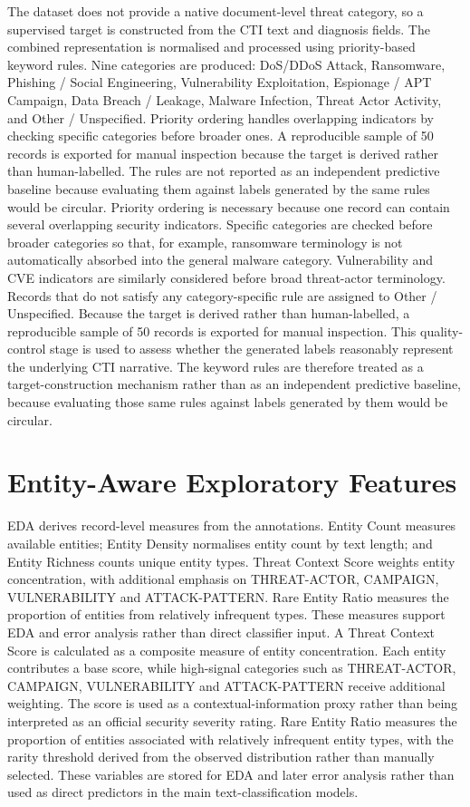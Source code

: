 \documentclass[12pt,a4paper]{report}
\begin{document}
The dataset does not provide a native document-level threat category, so
a supervised target is constructed from the CTI text and diagnosis
fields. The combined representation is normalised and processed using
priority-based keyword rules. Nine categories are produced: DoS/DDoS
Attack, Ransomware, Phishing / Social Engineering, Vulnerability
Exploitation, Espionage / APT Campaign, Data Breach / Leakage, Malware
Infection, Threat Actor Activity, and Other / Unspecified. Priority
ordering handles overlapping indicators by checking specific categories
before broader ones. A reproducible sample of 50 records is exported for
manual inspection because the target is derived rather than
human-labelled. The rules are not reported as an independent predictive
baseline because evaluating them against labels generated by the same
rules would be circular. Priority ordering is necessary because one
record can contain several overlapping security indicators. Specific
categories are checked before broader categories so that, for example,
ransomware terminology is not automatically absorbed into the general
malware category. Vulnerability and CVE indicators are similarly
considered before broad threat-actor terminology. Records that do not
satisfy any category-specific rule are assigned to Other / Unspecified.
Because the target is derived rather than human-labelled, a reproducible
sample of 50 records is exported for manual inspection. This
quality-control stage is used to assess whether the generated labels
reasonably represent the underlying CTI narrative. The keyword rules are
therefore treated as a target-construction mechanism rather than as an
independent predictive baseline, because evaluating those same rules
against labels generated by them would be circular.
\section{Entity-Aware Exploratory
Features}\label{entity-aware-exploratory-features}

EDA derives record-level measures from the annotations. Entity Count
measures available entities; Entity Density normalises entity count by
text length; and Entity Richness counts unique entity types. Threat
Context Score weights entity concentration, with additional emphasis on
THREAT-ACTOR, CAMPAIGN, VULNERABILITY and ATTACK-PATTERN. Rare Entity
Ratio measures the proportion of entities from relatively infrequent
types. These measures support EDA and error analysis rather than direct
classifier input. A Threat Context Score is calculated as a composite
measure of entity concentration. Each entity contributes a base score,
while high-signal categories such as THREAT-ACTOR, CAMPAIGN,
VULNERABILITY and ATTACK-PATTERN receive additional weighting. The score
is used as a contextual-information proxy rather than being interpreted
as an official security severity rating. Rare Entity Ratio measures the
proportion of entities associated with relatively infrequent entity
types, with the rarity threshold derived from the observed distribution
rather than manually selected. These variables are stored for EDA and
later error analysis rather than used as direct predictors in the main
text-classification models.
\FloatBarrier
\end{document}
